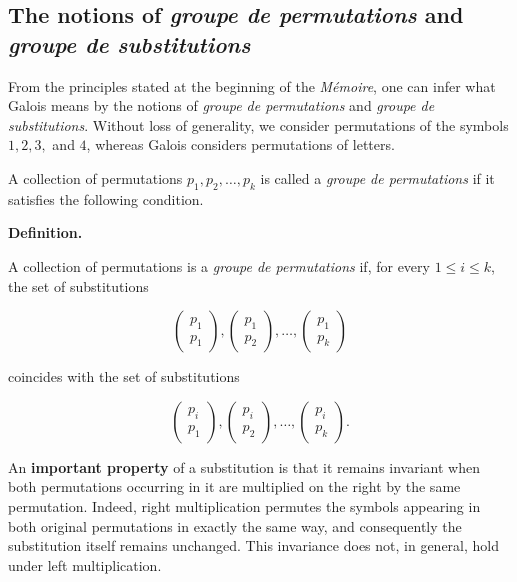 \documentclass[a4paper,11pt]{article}
\begin{document}
\subsection{The notions of \textit{groupe de permutations} and \textit{groupe de substitutions}}

From the principles stated at the beginning of the \textit{Mémoire}, one can infer what Galois means by the notions of \textit{groupe de permutations} and \textit{groupe de substitutions}. Without loss of generality, we consider permutations of the symbols \(1,2,3,\) and \(4\), whereas Galois considers permutations of letters.

A collection of permutations \(p_1,p_2,\dots,p_k\) is called a \textit{groupe de permutations} if it satisfies the following condition.

\bigskip

\noindent
\textbf{Definition.}

A collection of permutations is a \textit{groupe de permutations} if, for every \(1 \le i \le k\), the set of substitutions

\[
\left(
\begin{array}{c}
	p_1\\
	p_1
\end{array}
\right),
\left(
\begin{array}{c}
	p_1\\
	p_2
\end{array}
\right),
\dots,
\left(
\begin{array}{c}
	p_1\\
	p_k
\end{array}
\right)
\]

coincides with the set of substitutions

\[
\left(
\begin{array}{c}
	p_i\\
	p_1
\end{array}
\right),
\left(
\begin{array}{c}
	p_i\\
	p_2
\end{array}
\right),
\dots,
\left(
\begin{array}{c}
	p_i\\
	p_k
\end{array}
\right).
\]

An \textbf{important property} of a substitution is that it remains invariant when both permutations occurring in it are multiplied on the right by the same permutation. Indeed, right multiplication permutes the symbols appearing in both original permutations in exactly the same way, and consequently the substitution itself remains unchanged. This invariance does not, in general, hold under left multiplication.
\end{document}
